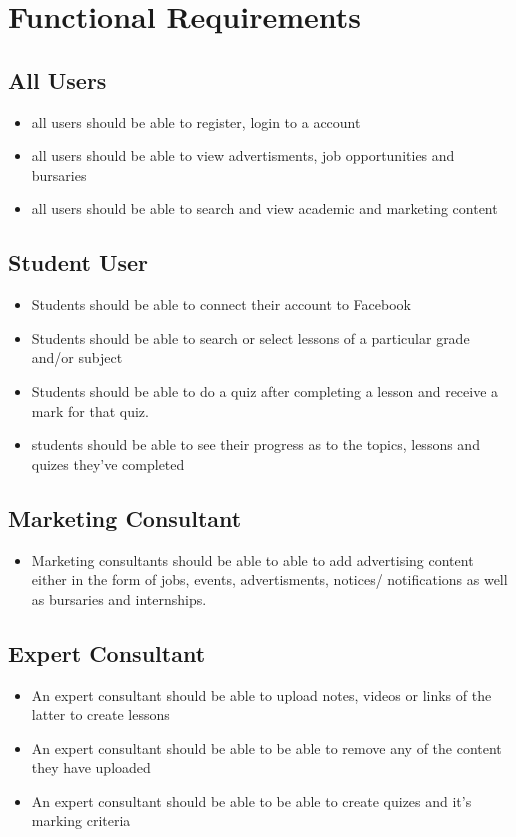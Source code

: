 \documentclass[10pt]{article}
\begin{document}
\section*{Functional Requirements}
\subsection*{All Users}
\begin{itemize}
\item all users should be able to register, login to a account
\item all users should be able to view advertisments, job opportunities and bursaries
\item all users should be able to search and view academic and marketing content
\end{itemize}

\subsection*{Student User}
\begin{itemize}
\item Students should be able to connect their account to Facebook
\item Students should be able to search or select lessons of a particular grade and/or subject
\item Students should be able to do a quiz after completing a lesson and receive a mark for that quiz.
\item students should be able to see their progress as to the topics, lessons and quizes they've completed
\end{itemize}

\subsection*{Marketing Consultant}
\begin{itemize}
\item Marketing consultants should be able to able to add advertising content either in the form of jobs, events, advertisments, notices/ notifications as well as bursaries and internships.
\end{itemize}

\subsection*{Expert Consultant}
\begin{itemize}
\item An expert consultant should be able to upload notes, videos or links of the latter to create lessons
\item An expert consultant should be able to be able to  remove any of the content they have uploaded
\item An expert consultant should be able to be able to create quizes and it's marking criteria
\end{itemize}
\end{document}
